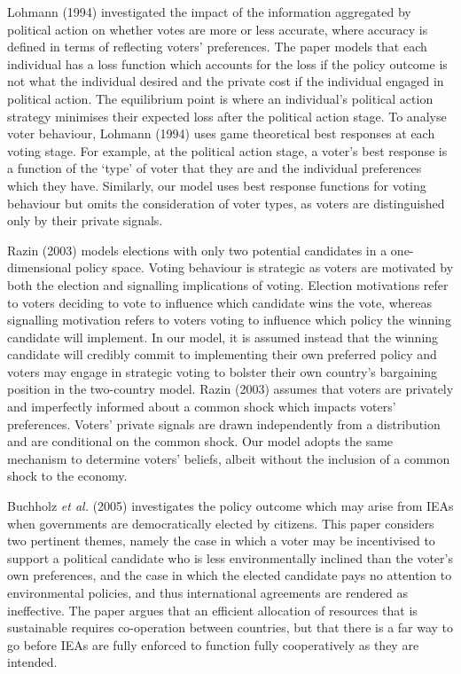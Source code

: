 \documentclass[11pt,preprint, authoryear]{elsarticle}
\numberwithin{equation}{section}
\numberwithin{figure}{section}
\numberwithin{table}{section}
\begin{document}
Lohmann (1994) investigated the impact of the information aggregated by
political action on whether votes are more or less accurate, where
accuracy is defined in terms of reflecting voters' preferences. The
paper models that each individual has a loss function which accounts for
the loss if the policy outcome is not what the individual desired and
the private cost if the individual engaged in political action. The
equilibrium point is where an individual's political action strategy
minimises their expected loss after the political action stage. To
analyse voter behaviour, Lohmann (1994) uses game theoretical best
responses at each voting stage. For example, at the political action
stage, a voter's best response is a function of the `type' of voter that
they are and the individual preferences which they have. Similarly, our
model uses best response functions for voting behaviour but omits the
consideration of voter types, as voters are distinguished only by their
private signals.

Razin (2003) models elections with only two potential candidates in a
one-dimensional policy space. Voting behaviour is strategic as voters
are motivated by both the election and signalling implications of
voting. Election motivations refer to voters deciding to vote to
influence which candidate wins the vote, whereas signalling motivation
refers to voters voting to influence which policy the winning candidate
will implement. In our model, it is assumed instead that the winning
candidate will credibly commit to implementing their own preferred
policy and voters may engage in strategic voting to bolster their own
country's bargaining position in the two-country model. Razin (2003)
assumes that voters are privately and imperfectly informed about a
common shock which impacts voters' preferences. Voters' private signals
are drawn independently from a distribution and are conditional on the
common shock. Our model adopts the same mechanism to determine voters'
beliefs, albeit without the inclusion of a common shock to the economy.

Buchholz \emph{et al.} (2005) investigates the policy outcome which may
arise from IEAs when governments are democratically elected by citizens.
This paper considers two pertinent themes, namely the case in which a
voter may be incentivised to support a political candidate who is less
environmentally inclined than the voter's own preferences, and the case
in which the elected candidate pays no attention to environmental
policies, and thus international agreements are rendered as ineffective.
The paper argues that an efficient allocation of resources that is
sustainable requires co-operation between countries, but that there is a
far way to go before IEAs are fully enforced to function fully
cooperatively as they are intended.
\end{document}
